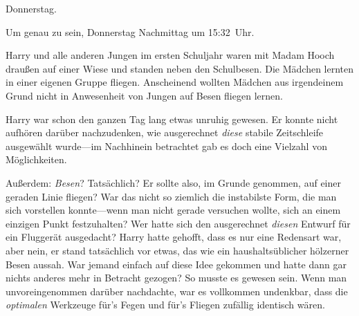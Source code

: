 \later

Donnerstag.

Um genau zu sein, Donnerstag Nachmittag um 15:32~Uhr.

Harry und alle anderen Jungen im ersten Schuljahr waren mit Madam Hooch draußen auf einer Wiese und standen neben den Schulbesen. Die Mädchen lernten in einer eigenen Gruppe fliegen. Anscheinend wollten Mädchen aus irgendeinem Grund nicht in Anwesenheit von Jungen auf Besen fliegen lernen.

Harry war schon den ganzen Tag lang etwas unruhig gewesen. Er konnte nicht aufhören darüber nachzudenken, wie ausgerechnet \emph{diese} stabile Zeitschleife ausgewählt wurde—im Nachhinein betrachtet gab es doch eine Vielzahl von Möglichkeiten.

Außerdem: \emph{Besen}? Tatsächlich? Er sollte also, im Grunde genommen, auf einer geraden Linie fliegen? War das nicht so ziemlich die instabilste Form, die man sich vorstellen konnte—wenn man nicht gerade versuchen wollte, sich an einem einzigen Punkt festzuhalten? Wer hatte sich den ausgerechnet \emph{diesen} Entwurf für ein Fluggerät ausgedacht? Harry hatte gehofft, dass es nur eine Redensart war, aber nein, er stand tatsächlich vor etwas, das wie ein haushaltsüblicher hölzerner Besen aussah. War jemand einfach auf diese Idee gekommen und hatte dann gar nichts anderes mehr in Betracht gezogen? So musste es gewesen sein. Wenn man unvoreingenommen darüber nachdachte, war es vollkommen undenkbar, dass die \emph{optimalen} Werkzeuge für’s Fegen und für’s Fliegen zufällig identisch wären.

